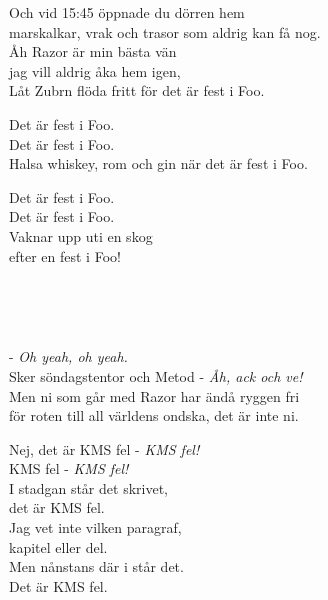 Och vid 15:45 öppnade du dörren hem \\ 
marskalkar, vrak och trasor som aldrig kan få nog. \\
Åh Razor är min bästa vän  \\ 
jag vill aldrig åka hem igen, \\
Låt Zubrn flöda fritt för det är fest i Foo.

\leftrepeat  Det är fest i Foo.  \\ 
Det är fest i Foo. \\ 
Halsa whiskey, rom och gin när det är fest i Foo. \rightrepeat 

Det är fest i Foo. \\ 
Det är fest i Foo. \\ 
Vaknar upp uti en skog \\ 
efter en fest i Foo! 

 \\

\newpage


 \\       
\author{Text: Frodo}

 - \textit{Oh yeah, oh yeah.}\\
Sker söndagstentor och Metod - \textit{Åh, ack och ve!} \\
Men ni som går med Razor har ändå ryggen fri \\
för roten till all världens ondska, det är inte ni.

Nej, det är KMS fel - \textit{KMS fel!} \\
KMS fel - \textit{KMS fel!} \\
I stadgan står det skrivet, \\
det är KMS fel. \\
Jag vet inte vilken paragraf, \\
kapitel eller del. \\
Men nånstans där i står det. \\
Det är KMS fel.

